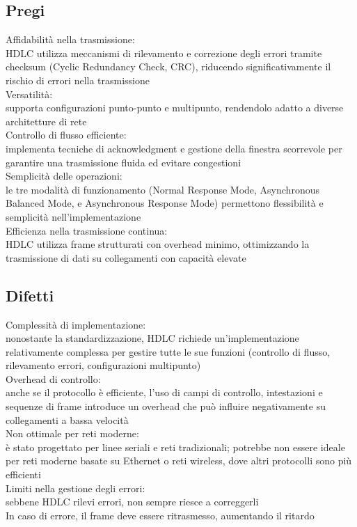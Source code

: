 \documentclass[10pt,oneside,a4paper]{article}
\begin{document}
\subsection{Pregi}
Affidabilità nella trasmissione:\\
HDLC utilizza meccanismi di rilevamento e correzione degli errori tramite checksum (Cyclic Redundancy Check, CRC), riducendo significativamente il rischio di errori nella trasmissione\\
Versatilità:\\
supporta configurazioni punto-punto e multipunto, rendendolo adatto a diverse architetture di rete\\
Controllo di flusso efficiente:\\
implementa tecniche di acknowledgment e gestione della finestra scorrevole per garantire una trasmissione fluida ed evitare congestioni\\
Semplicità delle operazioni:\\
le tre modalità di funzionamento (Normal Response Mode, Asynchronous Balanced Mode, e Asynchronous Response Mode) permettono flessibilità e semplicità nell'implementazione\\
Efficienza nella trasmissione continua:\\
HDLC utilizza frame strutturati con overhead minimo, ottimizzando la trasmissione di dati su collegamenti con capacità elevate
\subsection{Difetti}
Complessità di implementazione:\\
nonostante la standardizzazione, HDLC richiede un'implementazione relativamente complessa per gestire tutte le sue funzioni (controllo di flusso, rilevamento errori, configurazioni multipunto)\\
Overhead di controllo:\\
anche se il protocollo è efficiente, l'uso di campi di controllo, intestazioni e sequenze di frame introduce un overhead che può influire negativamente su collegamenti a bassa velocità\\
Non ottimale per reti moderne:\\
è stato progettato per linee seriali e reti tradizionali; potrebbe non essere ideale per reti moderne basate su Ethernet o reti wireless, dove altri protocolli sono più efficienti\\
Limiti nella gestione degli errori:\\
sebbene HDLC rilevi errori, non sempre riesce a correggerli\\
In caso di errore, il frame deve essere ritrasmesso, aumentando il ritardo
\end{document}
